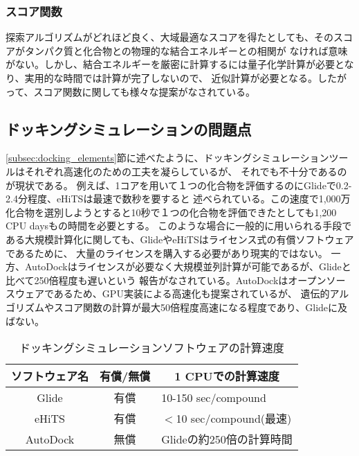 \subsubsection{スコア関数}
探索アルゴリズムがどれほど良く、大域最適なスコアを得たとしても、そのスコアがタンパク質と化合物との物理的な結合エネルギーとの相関が
なければ意味がない。しかし、結合エネルギーを厳密に計算するには量子化学計算が必要となり、実用的な時間では計算が完了しないので、
近似計算が必要となる。したがって、スコア関数に関しても様々な提案がなされている。

\subsection{ドッキングシミュレーションの問題点}\label{subsec:docking_problem}
\ref{subsec:docking_elements}節に述べたように、ドッキングシミュレーションツールはそれぞれ高速化のための工夫を凝らしているが、
それでも不十分であるのが現状である。
例えば、1コアを用いて１つの化合物を評価するのにGlideで0.2-2.4分程度\cite{Friesner2004}、eHiTSは最速で数秒\cite{Zsoldos2007}を要すると
述べられている。この速度で1,000万化合物を選別しようとすると10秒で１つの化合物を評価できたとしても1,200 CPU daysもの時間を必要とする。
このような場合に一般的に用いられる手段である大規模計算化に関しても、GlideやeHiTSはライセンス式の有償ソフトウェアであるために、
大量のライセンスを購入する必要があり現実的ではない。
一方、AutoDockはライセンスが必要なく大規模並列計算が可能であるが、Glideと比べて250倍程度も遅いという
報告がなされている\cite{Tuccinardi2010}。AutoDockはオープンソースウェアであるため、GPU実装による高速化も提案されているが、
遺伝的アルゴリズムやスコア関数の計算が最大50倍程度高速になる程度であり\cite{Kannan2010}、Glideに及ばない。

\begin{table}[htb] \centering
	\caption{ドッキングシミュレーションソフトウェアの計算速度}
	\label{table:docking_tools}
	\begin{tabular}{c|cl}
	\hline
	ソフトウェア名					&有償/無償				&\multicolumn{1}{c}{1 CPUでの計算速度} 					\\ \hline
	Glide							&有償						&10-150 sec/compound\cite{Friesner2004}				\\
	eHiTS							&有償						&$<$10 sec/compound(最速)\cite{Zsoldos2007}			\\
	AutoDock					&無償						&Glideの約250倍の計算時間\cite{Tuccinardi2010}		\\ \hline
	\end{tabular}
\end{table}

